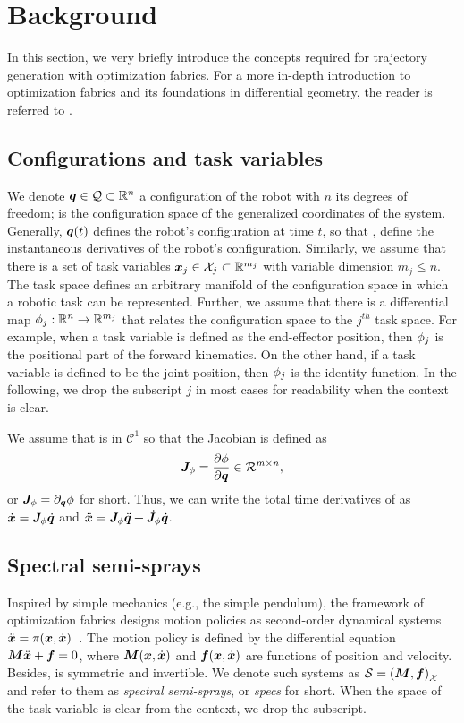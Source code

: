 \section{Background}
\label{sec:optimization_fabrics}
%
In this section, we very briefly introduce the concepts required for trajectory
generation with optimization fabrics. For a more in-depth introduction to
optimization fabrics and its foundations in differential geometry, the reader
is referred to \cite{Ratliff2020,Spahn2022,Wyk2022}.
%
\subsection{Configurations and task variables}%
\label{sub:configurations_and_task_variables}
%
We denote $\bm{q}\in\mathcal{Q}\subset\mathbb{R}^n$ a
configuration of the robot with $n$ its degrees of freedom;
\Q{} is the configuration space of the generalized coordinates
of the system. Generally, $\bm{q}(t)$ defines the robot's configuration at time $t$, so that 
\qdot, \qddot{} define the instantaneous derivatives of the robot's configuration.
Similarly, we assume
that there is a set of task variables $\bm{x}_j\in\mathcal{X}_j\subset\mathbb{R}^{m_j}$ with variable dimension
$m_j \leq n$. The task space \Xj{} defines an arbitrary manifold of the configuration
space \Q{} in which a robotic task can be represented. 
Further, we assume that there is a differential map
$\phi_j:\mathbb{R}^n\rightarrow\mathbb{R}^{m_j}$ that relates the configuration space to the $j^{th}$ task
space. For example, when a task variable is defined as the end-effector position, then
$\phi_j$ is the positional part of the forward kinematics. On the other hand, if a task
variable is defined to be the joint position, then $\phi_j$ is the identity function. 
In the following, we drop the subscript $j$ in most cases for readability when the
context is clear.

We assume that \map{} is in $\mathcal{C}^1$ so that the Jacobian is
defined as
\begin{equation}
  \bm{J}_{\phi} = \frac{\partial\phi}{\partial\bm{q}} \in \mathcal{R}^{m\times n}, 
\end{equation}
or $\bm{J}_{\phi} = \partial_{\bm{q}}\phi$ for short.
Thus, we can write the total time derivatives of \x{} as
$\dot{\bm{x}} = \bm{J}_{\phi}\dot{\bm{q}}$ and $\ddot{\bm{x}} = \bm{J}_{\phi}\ddot{\bm{q}} + \dot{\bm{J}}_{\phi}\dot{\bm{q}}$.
%
\subsection{Spectral semi-sprays}%
\label{sub:semi_spectral_sprays}
%
Inspired by simple mechanics (e.g., the simple pendulum), the framework of optimization
fabrics designs motion policies as second-order dynamical
systems $\ddot{\bm{x}} = \pi(\bm{x},\dot{\bm{x}})$~\cite{Cheng2020,Ratliff2020}.
The motion policy is defined by the differential equation
$\bm{M}\ddot{\bm{x}} + \bm{f} = 0$, where $\bm{M}(\bm{x},\dot{\bm{x}})$ and $\bm{f}(\bm{x},\dot{\bm{x}})$ are functions of position and
velocity. Besides, \M{} is symmetric and invertible. We denote such systems as $\mathcal{S} = \left(\bm{M},\bm{f}\right)_{\mathcal{X}}$ and
refer to them as \textit{spectral semi-sprays}, or \textit{specs} for short.  When the space of
the task variable is clear from the context, we drop the subscript. 

